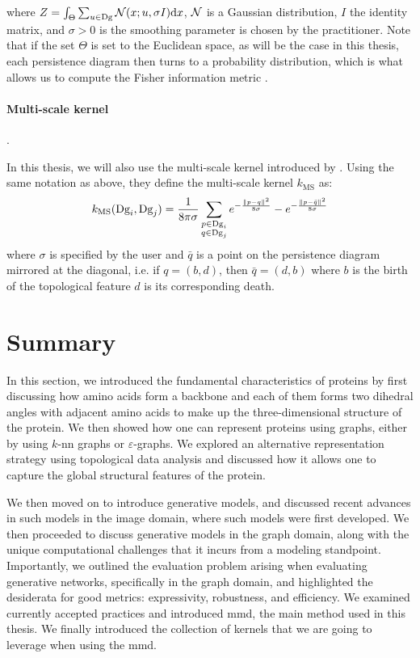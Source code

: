 where $Z=\int_{\Theta}\sum_{u\in\textnormal{Dg}}\mathcal{N}(x;u,\sigma I) \mathrm{d} x$, $\mathcal{N}$ is a
Gaussian distribution, $I$ the identity matrix, and $\sigma>0$ is the smoothing
parameter is chosen by the practitioner. Note that if the set $\Theta$ is set to
the Euclidean space, as will be the case in this thesis, each persistence
diagram then turns to a probability distribution, which is what allows us to
compute the Fisher information metric
\citep{anirudh2016riemannian,adams2017persistence}.

\paragraph{Multi-scale kernel}.

In this thesis, we will also use the multi-scale kernel introduced by
\cite{reininghaus2015stable}. Using the same notation as above, they define the
multi-scale kernel $k_{\text{MS}}$ as:
\begin{equation}
  \label{eq:msk}
  k_{\text{MS}}(\textnormal{Dg}_i,\textnormal{Dg}_j) = {1\over 8\pi\sigma} \sum_{\substack{p\in\textnormal{Dg}_i\\ q\in\textnormal{Dg}_j}} e^{-{\|p-q\|^2\over 8\sigma}}-e^{-{\|p-\bar{q}\|^2\over 8\sigma}}
\end{equation}
where $\sigma$ is specified by the user and $\bar{q}$ is a point on the
persistence diagram mirrored at the diagonal, i.e. if $q=(b,d)$, then
$\bar{q}=(d,b)$ where $b$ is the birth of the topological feature $d$ is its
corresponding death.

\section{Summary}

In this section, we introduced the fundamental characteristics of proteins by
first discussing how amino acids form a backbone and each of them forms two
dihedral angles with adjacent amino acids to make up the three-dimensional
structure of the protein. We then showed how one can represent proteins using
graphs, either by using $k$-nn graphs or $\varepsilon$-graphs. We explored an
alternative representation strategy using topological data analysis and
discussed how it allows one to capture the global structural features of the
protein.

We then moved on to introduce generative models, and discussed recent advances in
such models in the image domain, where such models were first developed. We then
proceeded to discuss generative models in the graph domain, along with the unique
computational challenges that it incurs from a modeling standpoint.
Importantly, we outlined the evaluation problem arising when evaluating
generative networks, specifically in the graph domain, and highlighted the
desiderata for good metrics: expressivity, robustness, and efficiency. We examined
currently accepted practices and introduced \acrshort{mmd}, the main
method used in this thesis. We finally introduced the collection of kernels that
we are going to leverage when using the \acrshort{mmd}.

